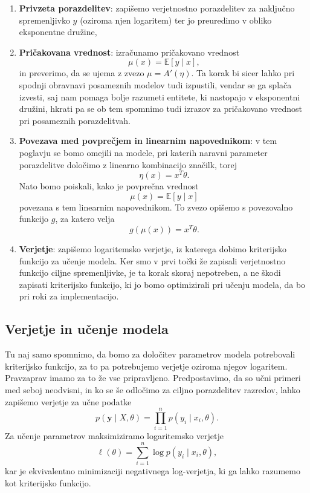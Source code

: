 \begin{enumerate}
\item \textbf{Privzeta porazdelitev}: zapišemo verjetnostno porazdelitev
      za naključno spremenljivko $y$ (oziroma njen logaritem) ter jo
      preuredimo v obliko eksponentne družine,

\item \textbf{Pričakovana vrednost}: izračunamo pričakovano vrednost
      \[
      \mu(x)=\mathbb{E}[y\mid x],
      \]
      in preverimo, da se ujema z zvezo $\mu = A'(\eta)$. Ta korak bi
      sicer lahko pri spodnji obravnavi posameznih modelov tudi
      izpustili, vendar se ga splača izvesti, saj nam pomaga bolje
      razumeti entitete, ki nastopajo v eksponentni družini, hkrati pa
      se ob tem spomnimo tudi izrazov za pričakovano vrednost pri
      posameznih porazdelitvah.

\item \textbf{Povezava med povprečjem in linearnim napovednikom}: 
      v tem poglavju se bomo omejili na modele, pri katerih naravni
      parameter porazdelitve določimo z linearno kombinacijo značilk,
      torej
      \[
      \eta(x)=x^T\theta.
      \]
      Nato bomo poiskali, kako je povprečna vrednost
      \[
      \mu(x)=\mathbb{E}[y\mid x]
      \]
      povezana s tem linearnim napovednikom. To zvezo opišemo s
      povezovalno funkcijo $g$, za katero velja
      \[
      g(\mu(x)) = x^T\theta.
      \]

\item \textbf{Verjetje}: zapišemo logaritemsko verjetje, iz katerega dobimo kriterijsko funkcijo za učenje modela. Ker smo v prvi točki že zapisali verjetnostno funkcijo ciljne spremenljivke, je ta korak skoraj nepotreben, a ne škodi zapisati kriterijsko funkcijo, ki jo bomo optimizirali pri učenju modela, da bo pri roki za implementacijo.
\end{enumerate}

\subsection{Verjetje in učenje modela}

Tu naj samo spomnimo, da bomo za določitev parametrov modela potrebovali kriterijsko funkcijo, za to pa potrebujemo verjetje oziroma njegov logaritem. Pravzaprav imamo za to že vse pripravljeno. Predpostavimo, da so učni primeri med seboj neodvisni, in ko se še odločimo za ciljno  porazdelitev razredov, lahko zapišemo verjetje za učne podatke
\[
p(\mathbf{y} \mid X, \theta) = \prod_{i=1}^n p(y_i \mid x_i, \theta).
\]
Za učenje parametrov maksimiziramo logaritemsko verjetje
\[
\ell(\theta) = \sum_{i=1}^n \log p(y_i \mid x_i, \theta),
\]
kar je ekvivalentno minimizaciji negativnega log-verjetja, ki ga lahko razumemo kot kriterijsko funkcijo.

